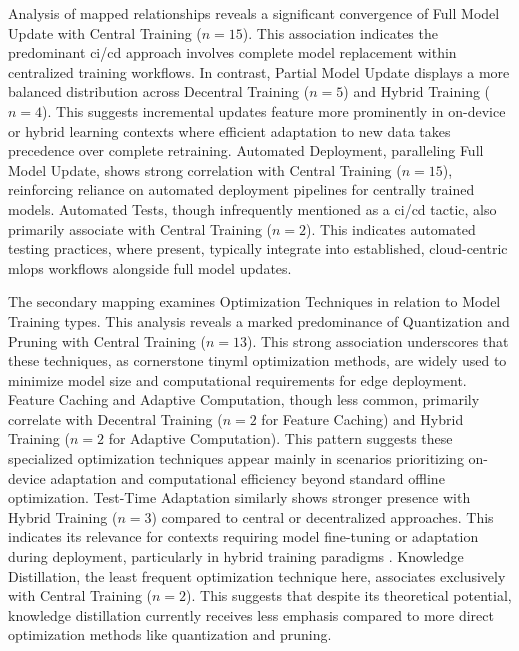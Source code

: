 Analysis of mapped relationships reveals a significant convergence of Full Model Update with Central Training ($n=15$). This association indicates the predominant \gls{ci}/\gls{cd} approach involves complete model replacement within centralized training workflows.
In contrast, Partial Model Update displays a more balanced distribution across Decentral Training ($n=5$) and Hybrid Training ($n=4$). This suggests incremental updates feature more prominently in on-device or hybrid learning contexts where efficient adaptation to new data takes precedence over complete retraining.
Automated Deployment, paralleling Full Model Update, shows strong correlation with Central Training ($n=15$), reinforcing reliance on automated deployment pipelines for centrally trained models.
Automated Tests, though infrequently mentioned as a \gls{ci}/\gls{cd} tactic, also primarily associate with Central Training ($n=2$). This indicates automated testing practices, where present, typically integrate into established, cloud-centric \gls{mlops} workflows alongside full model updates.

The secondary mapping examines Optimization Techniques in relation to Model Training types. This analysis reveals a marked predominance of Quantization and Pruning with Central Training ($n=13$). This strong association underscores that these techniques, as cornerstone \gls{tinyml} optimization methods, are widely used to minimize model size and computational requirements for edge deployment.
Feature Caching and Adaptive Computation, though less common, primarily correlate with Decentral Training ($n=2$ for Feature Caching) and Hybrid Training ($n=2$ for Adaptive Computation). This pattern suggests these specialized optimization techniques appear mainly in scenarios prioritizing on-device adaptation and computational efficiency beyond standard offline optimization.
Test-Time Adaptation similarly shows stronger presence with Hybrid Training ($n=3$) compared to central or decentralized approaches. This indicates its relevance for contexts requiring model fine-tuning or adaptation during deployment, particularly in hybrid training paradigms \cite{moskalenkoResilienceawareMLOpsResourceconstrained2023}.
Knowledge Distillation, the least frequent optimization technique here, associates exclusively with Central Training ($n=2$). This suggests that despite its theoretical potential, knowledge distillation currently receives less emphasis compared to more direct optimization methods like quantization and pruning.

